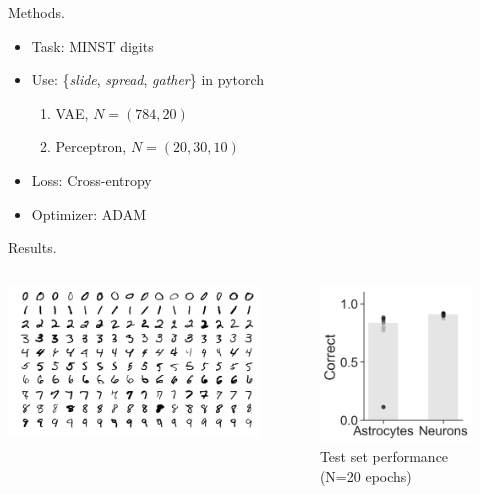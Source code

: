 \documentclass[10pt]{beamer}
\begin{document}
\begin{frame}[fragile]{Methods.}
\begin{itemize}
    \item \alert{Task}: MINST digits
    \item \alert{Use}: \{\textit{slide}, \textit{spread}, \textit{gather}\} in pytorch
    \begin{enumerate}
        \item VAE, $N=(784,20)$
        \item Perceptron, $N=(20,30,10)$    
    \end{enumerate}
    \item Loss: Cross-entropy
    \item Optimizer: ADAM
\end{itemize}
\end{frame}

\begin{frame}[fragile]{Results.}
\begin{columns}
    \centering
    \includegraphics[scale=0.2]{images/minst.png} 
\begin{figure}
    \centering
    \includegraphics[scale=0.3]{images/results.png} 
    \caption{Test set performance (N=20 epochs)}
\end{figure}
\end{columns}
\end{frame}
\end{document}
